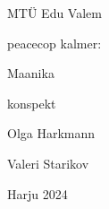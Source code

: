 \begin{titlepage}
\par{MTÜ Edu Valem}
\vspace{0.3\textheight}
\par{peacecop kalmer:}
\LARGE
\par{Maanika}
\normalsize
\par{konspekt}
\vspace{0.3\textheight}
\begin{flushright}
\par{Olga Harkmann}
\par{Valeri Starikov}
\end{flushright}
\vfill
Harju
\hfill
2024
\end{titlepage}

